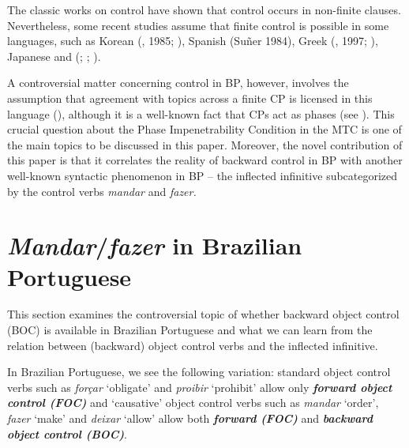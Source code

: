 \documentclass[output=paper]{langsci/langscibook}
\begin{document}
\noindent The classic works on control have shown that control occurs in non-finite clauses. Nevertheless, some recent studies assume that finite control is possible in some languages, such as Korean (\citealt{Yang1982}, 1985; \citealt{Borer1989}), Spanish (Suñer 1984), Greek (\citealt{Terzi1992}, 1997; \citealt{Alexiadou2010,Alexiadou2011}), Japanese \citep{Uchibori2000} and (\citealt{Farrell1995}; \citealt{Rodrigues2004}; \citealt{Boeckx2006}).

A controversial matter concerning control in BP, however, involves the assumption that agreement with topics across a finite CP is licensed in this language (\citealt{Martins2010}), although it is a well-known fact that CPs act as phases (see \citealt{Chomsky2000}). This crucial question about the Phase Impenetrability Condition in the MTC is one of the main topics to be discussed in this paper. Moreover, the novel contribution of this paper is that it correlates the reality of backward control in BP with another well-known syntactic phenomenon in BP – the inflected infinitive subcategorized by the control verbs \textit{mandar} and \textit{fazer.}

\section{\textit{Mandar}/\textit{fazer} in Brazilian Portuguese}%

This section examines the controversial topic of whether backward object control (BOC) is available in Brazilian Portuguese and what we can learn from the relation between (backward) object control verbs and the inflected infinitive.

In Brazilian Portuguese, we see the following variation: standard object control verbs such as \textit{forçar} ‘obligate’ and \textit{proibir} ‘prohibit’ allow only \textbf{\textit{forw}}\textbf{\textit{ard object control (FOC)}}  and ‘causative’ object control verbs such as \textit{mandar} ‘order’, \textit{fazer} ‘make’ and \textit{deixar} ‘allow’ allow both \textbf{\textit{forward (FOC)}} and \textbf{\textit{backward object control (BOC)}}.  
\end{document}
